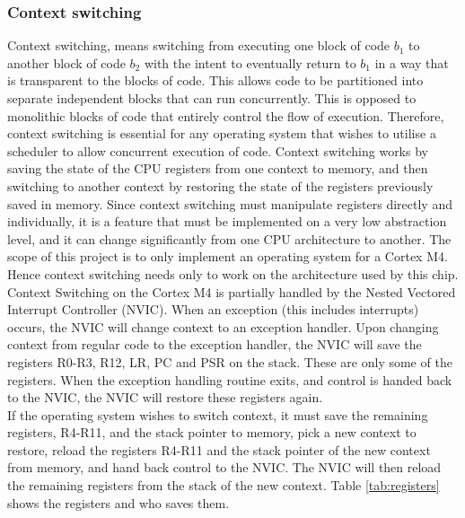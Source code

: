 \subsubsection{Context switching}
Context switching, means switching from executing one block of code $b_1$ to another block of code $b_2$
with the intent to eventually return to $b_1$ in a way that is transparent to the blocks of code.
This allows code to be partitioned into separate independent blocks that can run concurrently.
This is opposed to monolithic blocks of code that entirely control the flow of execution.
Therefore, context switching is essential for any operating system that wishes to utilise a scheduler to allow concurrent execution of code.
Context switching works by saving the state of the CPU registers from one context to memory,
and then switching to another context by restoring the state of the registers previously saved in memory.
Since context switching must manipulate registers directly and individually, it is a feature that must be implemented
on a very low abstraction level, and it can change significantly from one CPU architecture to another.
The scope of this project is to only implement an operating system for a Cortex M4. Hence context switching needs only
to work on the architecture used by this chip.\\

Context Switching on the Cortex M4 is partially handled by the Nested Vectored Interrupt Controller (NVIC).
When an exception (this includes interrupts) occurs, the NVIC will change context to an exception handler.
Upon changing context from regular code to the exception handler, the NVIC will save the registers R0-R3, R12, LR, PC and PSR
on the stack. These are only some of the registers.
When the exception handling routine exits, and control is handed back to the NVIC,
the NVIC will restore these registers again.\\

If the operating system wishes to switch context, it must save the remaining registers, R4-R11, and the stack pointer to memory,
pick a new context to restore, reload the registers R4-R11 and the stack pointer of the new context from memory,
and hand back control to the NVIC. The NVIC will then reload the remaining
registers from the stack of the new context. Table \ref{tab:registers} shows the registers
and who saves them.\\

